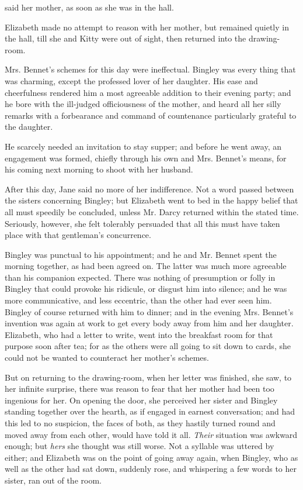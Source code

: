 said her mother, as soon as she was in the hall. 

Elizabeth made no attempt to reason with her mother, but remained quietly in the hall, till she and Kitty were out of sight, then returned into the drawing-room.

Mrs. Bennet's schemes for this day were ineffectual. Bingley was every thing that was charming, except the professed lover of her daughter. His ease and cheerfulness rendered him a most agreeable addition to their evening party; and he bore with the ill-judged officiousness of the mother, and heard all her silly remarks with a forbearance and command of countenance particularly grateful to the daughter.

He scarcely needed an invitation to stay supper; and before he went away, an engagement was formed, chiefly through his own and Mrs. Bennet's means, for his coming next morning to shoot with her husband.

After this day, Jane said no more of her indifference. Not a word passed between the sisters concerning Bingley; but Elizabeth went to bed in the happy belief that all must speedily be concluded, unless Mr. Darcy returned within the stated time. Seriously, however, she felt tolerably persuaded that all this must have taken place with that gentleman's concurrence.

Bingley was punctual to his appointment; and he and Mr. Bennet spent the morning together, as had been agreed on. The latter was much more agreeable than his companion expected. There was nothing of presumption or folly in Bingley that could provoke his ridicule, or disgust him into silence; and he was more communicative, and less eccentric, than the other had ever seen him. Bingley of course returned with him to dinner; and in the evening Mrs. Bennet's invention was again at work to get every body away from him and her daughter. Elizabeth, who had a letter to write, went into the breakfast room for that purpose soon after tea; for as the others were all going to sit down to cards, she could not be wanted to counteract her mother's schemes.

But on returning to the drawing-room, when her letter was finished, she saw, to her infinite surprise, there was reason to fear that her mother had been too ingenious for her. On opening the door, she perceived her sister and Bingley standing together over the hearth, as if engaged in earnest conversation; and had this led to no suspicion, the faces of both, as they hastily turned round and moved away from each other, would have told it all. {\em Their} situation was awkward enough; but {\em hers} she thought was still worse. Not a syllable was uttered by either; and Elizabeth was on the point of going away again, when Bingley, who as well as the other had sat down, suddenly rose, and whispering a few words to her sister, ran out of the room.

